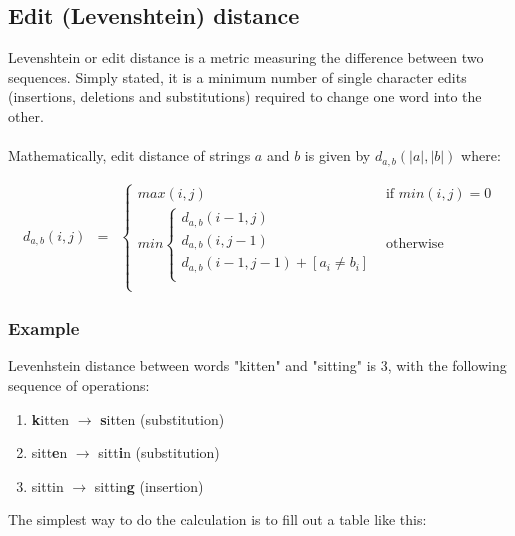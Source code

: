 \documentclass[times, utf8, diplomski]{fer}
\begin{document}
\subsection{Edit (Levenshtein) distance}
\label{edit.distance.algo}

Levenshtein or edit distance is a metric measuring the difference between two sequences. Simply stated, it is a minimum number of single character edits (insertions, deletions and substitutions) required to change one word into the other.
\\
\\
Mathematically, edit distance of strings $a$ and $b$ is given by $d_{a,b}(|a|,|b|)$ where:

\begin{eqnarray}
	\label{levenshtein}
	d_{a,b}\left(i,j\right) & = & 
							\left\{
								\begin{array}{ll}
								max(i,j) & \mbox{if } min(i,j) = 0\\	
								min\left\{
									\begin{array}{ll}
									d_{a,b}(i-1,j)\\	
									d_{a,b}(i,j-1)\\	
									d_{a,b}(i-1,j-1) + [a_i\ne b_i]\\	
									\end{array}
									\right.&\mbox{otherwise}\\
								\end{array}
							\right.
\end{eqnarray}

\subsubsection{Example}
Levenhstein distance between words "kitten" and "sitting" is 3, with the following sequence of operations:

\begin{enumerate}\itemsep0pt
\item \textbf{k}itten $\rightarrow$ \textbf{s}itten (substitution)
\item sitt\textbf{e}n $\rightarrow$ sitt\textbf{i}n (substitution)
\item sittin $\rightarrow$ sittin\textbf{g} (insertion)
\end{enumerate}
The simplest way to do the calculation is to fill out a table like this:
\end{document}
